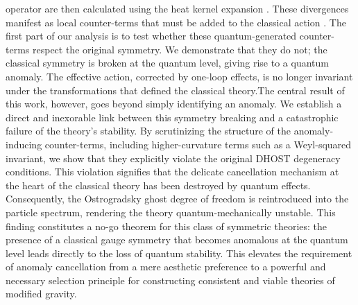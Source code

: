 \documentclass[twocolumn]{aastex631}
\begin{document}
operator are then calculated using the heat kernel expansion \citep{branchina2024pathintegralmeasurecosmological,ferrero2025oneloopeffectiveactioncoherent}. These divergences manifest as local counter-terms that must be added to the classical action \citep{ferrero2025oneloopeffectiveactioncoherent}. The first part of our analysis is to test whether these quantum-generated counter-terms respect the original symmetry. We demonstrate that they do not; the classical symmetry is broken at the quantum level, giving rise to a quantum anomaly. The effective action, corrected by one-loop effects, is no longer invariant under the transformations that defined the classical theory.The central result of this work, however, goes beyond simply identifying an anomaly. We establish a direct and inexorable link between this symmetry breaking and a catastrophic failure of the theory's stability. By scrutinizing the structure of the anomaly-inducing counter-terms, including higher-curvature terms such as a Weyl-squared invariant, we show that they explicitly violate the original DHOST degeneracy conditions. This violation signifies that the delicate cancellation mechanism at the heart of the classical theory has been destroyed by quantum effects. Consequently, the Ostrogradsky ghost degree of freedom is reintroduced into the particle spectrum, rendering the theory quantum-mechanically unstable. This finding constitutes a no-go theorem for this class of symmetric theories: the presence of a classical gauge symmetry that becomes anomalous at the quantum level leads directly to the loss of quantum stability. This elevates the requirement of anomaly cancellation from a mere aesthetic preference to a powerful and necessary selection principle for constructing consistent and viable theories of modified gravity.
\end{document}
